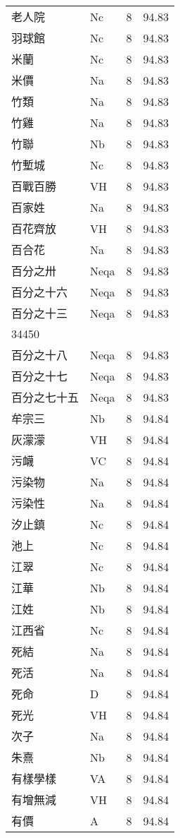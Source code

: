 \documentclass[twocolumn]{book}
\begin{document}
\begin{supertabular}{llrr}
老人院 & Nc & 8 &  94.83\\
羽球館 & Nc & 8 &  94.83\\
米蘭 & Nc & 8 &  94.83\\
米價 & Na & 8 &  94.83\\
竹類 & Na & 8 &  94.83\\
竹雞 & Na & 8 &  94.83\\
竹聯 & Nb & 8 &  94.83\\
竹塹城 & Nc & 8 &  94.83\\
百戰百勝 & VH & 8 &  94.83\\
百家姓 & Na & 8 &  94.83\\
百花齊放 & VH & 8 &  94.83\\
百合花 & Na & 8 &  94.83\\
百分之卅 & Neqa & 8 &  94.83\\
百分之十六 & Neqa & 8 &  94.83\\
百分之十三 & Neqa & 8 &  94.83\\
34450\\
百分之十八 & Neqa & 8 &  94.83\\
百分之十七 & Neqa & 8 &  94.83\\
百分之七十五 & Neqa & 8 &  94.83\\
牟宗三 & Nb & 8 &  94.84\\
灰濛濛 & VH & 8 &  94.84\\
污衊 & VC & 8 &  94.84\\
污染物 & Na & 8 &  94.84\\
污染性 & Na & 8 &  94.84\\
汐止鎮 & Nc & 8 &  94.84\\
池上 & Nc & 8 &  94.84\\
江翠 & Nc & 8 &  94.84\\
江華 & Nb & 8 &  94.84\\
江姓 & Nb & 8 &  94.84\\
江西省 & Nc & 8 &  94.84\\
死結 & Na & 8 &  94.84\\
死活 & Na & 8 &  94.84\\
死命 & D & 8 &  94.84\\
死光 & VH & 8 &  94.84\\
次子 & Na & 8 &  94.84\\
朱熹 & Nb & 8 &  94.84\\
有樣學樣 & VA & 8 &  94.84\\
有增無減 & VH & 8 &  94.84\\
有價 & A & 8 &  94.84\\

\end{supertabular}
\end{document}
